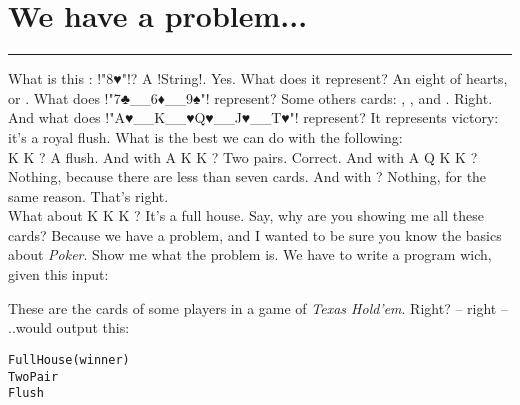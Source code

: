  \newpage
\section{We have a problem...} 
\vspace{10cm}
\hrule

\lhQ What is this : \il!"8♥"!?
\lhA A \il!String!.
\lhN Yes. What does it represent?
\lhA An eight of hearts, or .
\lhN What does \il!"7♣__6♦__9♠"! represent?
\lhA Some others cards: , , and .
\lhN Right. And what does \il!"A♥__K__♥Q♥__J♥__T♥"! represent?
\lhA It represents victory: it's a royal flush.
\lhN What is the best we can do with the following: \\
   \spades K \diamonds K   ?
\lhA A flush.
\lhN And with  \hearts A \spades K \diamonds K   ?
\lhA Two pairs.
\lhN Correct. And with \clubs A \clubs Q \spades K \diamonds K  ?
\lhA Nothing, because there are less than seven cards.
\lhN And with  ?
\lhA Nothing, for the same reason.
\lhN That's right. \\
What about \clubs K  \spades K \diamonds K    ?
\lhA It's a full house. Say, why are you showing me all these cards?
\lhN Because we have a problem, and I wanted to be sure you know the basics about \emph{Poker}.
\lhA Show me what the problem is.
\lhN We have to write a program wich, given this input:
\begin{alltt}
      
      
     
 
      
    
\end{alltt}
 
\lhA These are the cards of some players in a game of \emph{Texas Hold'em}. Right?
\lhN -- right -- ..would output this:
\begin{alltt}
       Full House (winner)
       Two Pair
      
  
       Flush
     
\end{alltt}
 
